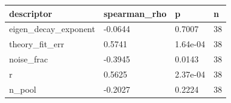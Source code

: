 \begin{tabular}{llll}
\hline
descriptor & spearman\_rho & p & n \\
\hline
eigen\_decay\_exponent & -0.0644 & 0.7007 & 38 \\
theory\_fit\_err & 0.5741 & 1.64e-04 & 38 \\
noise\_frac & -0.3945 & 0.0143 & 38 \\
r & 0.5625 & 2.37e-04 & 38 \\
n\_pool & -0.2027 & 0.2224 & 38 \\
\hline
\end{tabular}

